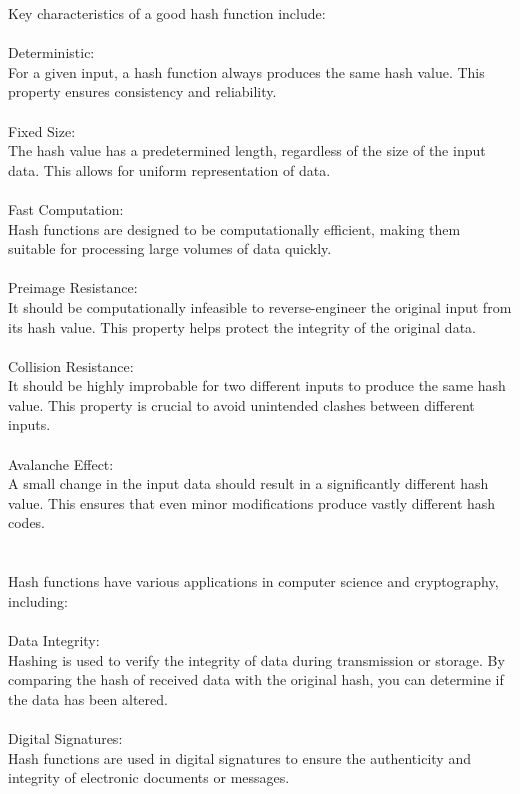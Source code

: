 \documentclass{report}
\begin{document}
Key characteristics of a good hash function include:\\
\\
Deterministic:\\
 For a given input, a hash function always produces the same hash value. This property ensures consistency and reliability.\\
\\
Fixed Size:\\
 The hash value has a predetermined length, regardless of the size of the input data. This allows for uniform representation of data.\\
\\
Fast Computation:\\
 Hash functions are designed to be computationally efficient, making them suitable for processing large volumes of data quickly.\\
\\
Preimage Resistance:\\
 It should be computationally infeasible to reverse-engineer the original input from its hash value. This property helps protect the integrity of the original data.\\
\\
Collision Resistance:\\
 It should be highly improbable for two different inputs to produce the same hash value. This property is crucial to avoid unintended clashes between different inputs.\\
\\
Avalanche Effect:\\
 A small change in the input data should result in a significantly different hash value. This ensures that even minor modifications produce vastly different hash codes.\\
\\
\\
Hash functions have various applications in computer science and cryptography, including:\\
\\
Data Integrity:\\
 Hashing is used to verify the integrity of data during transmission or storage. By comparing the hash of received data with the original hash, you can determine if the data has been altered.\\
\\
Digital Signatures:\\
 Hash functions are used in digital signatures to ensure the authenticity and integrity of electronic documents or messages.\\
\end{document}
